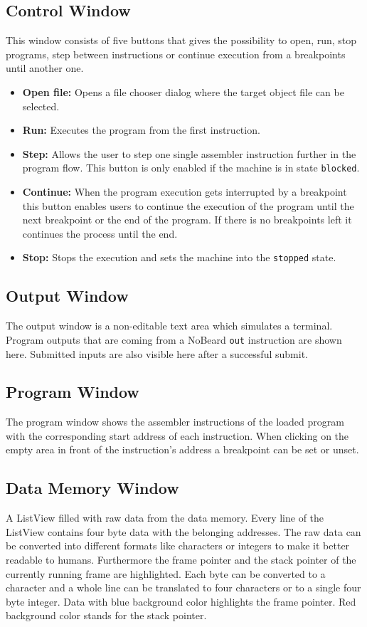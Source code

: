 \subsection{Control Window}
This window consists of five buttons that gives the possibility to open, run, stop programs, step between instructions or continue execution from a breakpoints until another one. 
\begin{itemize}
\item \textbf{Open file: }Opens a file chooser dialog where the target object file can be selected.
\item \textbf{Run: }Executes the program from the first instruction. 
\item \textbf{Step: }Allows the user to step one single assembler instruction further in the program flow. This button is only enabled if the machine is in state \lstinline$blocked$.
\item \textbf{Continue: }When the program execution gets interrupted by a breakpoint this button enables users to continue the execution of the program until the next breakpoint or the end of the program. If there is no breakpoints left it continues the process until the end.
\item \textbf{Stop: }Stops the execution and sets the machine into the \lstinline$stopped$ state.
\end{itemize}
\subsection{Output Window}
The output window is a non-editable text area which simulates a terminal. Program outputs that are coming from a NoBeard \lstinline$out$ instruction are shown here. Submitted inputs are also visible here after a successful submit.
\subsection{Program Window}
The program window shows the assembler instructions of the loaded program with the corresponding start address of each instruction. When clicking on the empty area in front of the instruction's address a breakpoint can be set or unset.  
\subsection{Data Memory Window}
A ListView filled with raw data from the data memory. Every line of the ListView contains four byte data with the belonging addresses. The raw data can be converted into different formats like characters or integers to make it better readable to humans. Furthermore the frame pointer and the stack pointer of the currently running frame are highlighted. Each byte can be converted to a character and a whole line can be translated to four characters or to a single four byte integer. Data with blue background color highlights the frame pointer. Red background color stands for the stack pointer.
